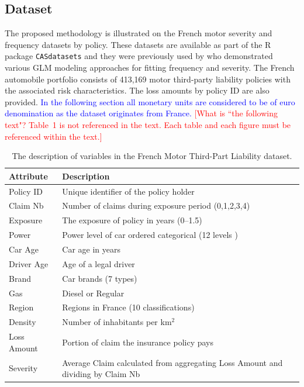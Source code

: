\documentclass[11pt,letterpaper]{article}
\numberwithin{equation}{section}
\numberwithin{equation}{section}
\numberwithin{equation}{section}
\begin{document}
\subsection{Dataset}
The proposed methodology is illustrated on the French motor severity and frequency datasets by policy. These datasets are available as part of the {\sf R} package {\tt CASdatasets} \citep{Dutang+Charpentier:2016} and they were previously used by \cite{Charpentier:2014} who demonstrated various GLM modeling approaches for fitting frequency and severity. The French automobile portfolio consists of 413,169 motor third-party liability policies with the associated risk characteristics. The loss amounts by policy ID are also provided.  \textcolor{blue}{ In the following section all monetary units are considered to be of euro denomination as the dataset originates from France.} \textcolor{red}{[What is ``the following text"? Table~1 is not referenced in the text. Each table and each figure must be referenced within the text.]}
\begin{small}
\begin{table}[!htb]
\begin{center}
    \caption{The description of variables in the French Motor Third-Part Liability dataset.}
      \centering
        \begin{tabular}{ll}
\hline
Attribute & Description \\
\hline
Policy ID & Unique identifier of the policy holder\\
Claim Nb & Number of claims during exposure period  (0,1,2,3,4)\\
Exposure & The exposure of policy in years (0--1.5) \\
Power & Power level of car ordered categorical (12 levels )\\
Car Age & Car age in years \\
Driver Age & Age of a legal driver \\
Brand & Car brands (7 types) \\
Gas & Diesel or Regular \\
Region & Regions in France (10 classifications)\\
Density & Number of inhabitants per km$^2$ \\
Loss Amount & Portion of claim the insurance policy pays\\
Severity & Average Claim calculated from aggregating Loss Amount and dividing by Claim Nb \\
\hline
		\end{tabular}
\end{center}
\end{table}
\end{small}
\end{document}
